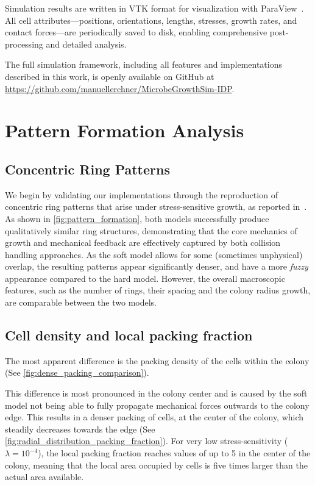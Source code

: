 \documentclass[conference]{IEEEtran}
\begin{document}
Simulation results are written in VTK format for visualization with ParaView~\cite{ahrens2005paraview}. All cell attributes—positions, orientations, lengths, stresses, growth rates, and contact forces—are periodically saved to disk, enabling comprehensive post-processing and detailed analysis.

The full simulation framework, including all features and implementations described in this work, is openly available on GitHub at \url{https://github.com/manuellerchner/MicrobeGrowthSim-IDP}.

\newpage

\section{Pattern Formation Analysis}

\subsection{Concentric Ring Patterns}

We begin by validating our implementations through the reproduction of concentric ring patterns that arise under stress-sensitive growth, as reported in~\cite{Weady2024}. As shown in \autoref{fig:pattern_formation}, both models successfully produce qualitatively similar ring structures, demonstrating that the core mechanics of growth and mechanical feedback are effectively captured by both collision handling approaches. As the soft model allows for some (sometimes unphysical) overlap, the resulting patterns appear significantly denser, and have a more \emph{fuzzy} appearance compared to the hard model. However, the overall macroscopic features, such as the number of rings, their spacing and the colony radius growth, are comparable between the two models.


\subsection{Cell density and local packing fraction}

The most apparent difference is the packing density of the cells within the colony (See \autoref{fig:dense_packing_comparison}).

This difference is most pronounced in the colony center and is caused by the soft model not being able to fully propagate mechanical forces outwards to the colony edge. This results in a denser packing of cells, at the center of the colony, which steadily decreases towards the edge (See \autoref{fig:radial_distribution_packing_fraction}). For very low stress-sensitivity ($\lambda = 10^{-4}$), the local packing fraction reaches values of up to 5 in the center of the colony, meaning that the local area occupied by cells is five times larger than the actual area available.
\end{document}
